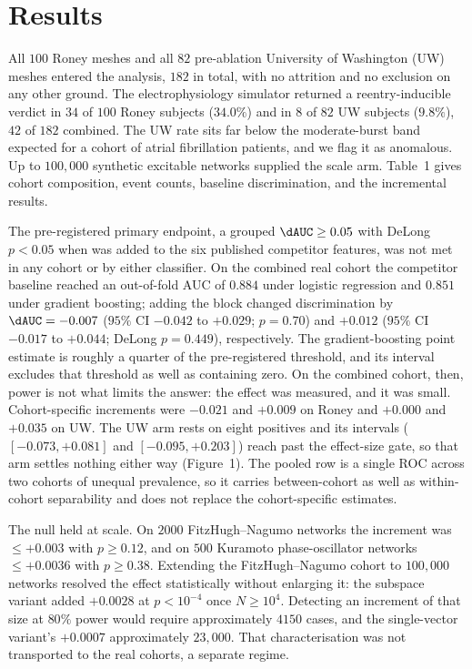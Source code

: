 ﻿\section{Results}

All $100$ Roney meshes and all $82$ pre-ablation University of Washington (UW)
meshes entered the analysis, $182$ in total, with no attrition and no exclusion
on any other ground. The
electrophysiology simulator returned a reentry-inducible verdict in $34$ of
$100$ Roney subjects ($34.0\%$) and in $8$ of $82$ UW subjects ($9.8\%$), $42$
of $182$ combined. The UW rate sits far below the moderate-burst band expected
for a cohort of atrial fibrillation patients, and we flag it as anomalous. Up to
$100{,}000$ synthetic excitable networks supplied the scale arm. Table~1 gives
cohort composition, event counts, baseline discrimination, and the incremental
results.

The pre-registered primary endpoint, a grouped $\dAUC\geq0.05$ with DeLong
$p<0.05$ when \SFI{} was added to the six published competitor features, was
not met in any cohort or by either classifier. On the combined real
cohort the competitor baseline reached an out-of-fold AUC of $0.884$ under
logistic regression and $0.851$ under gradient boosting; adding the \SFI{} block
changed discrimination by $\dAUC=-0.007$ ($95\%$ CI $-0.042$ to $+0.029$;
$p=0.70$) and $+0.012$ ($95\%$ CI $-0.017$ to $+0.044$; DeLong $p=0.449$),
respectively. The gradient-boosting point estimate is roughly a quarter of the
pre-registered threshold, and its interval excludes that threshold as well as
containing zero. On the combined cohort, then, power is not what limits the
answer: the effect was measured, and it was small. Cohort-specific increments
were $-0.021$ and $+0.009$ on Roney and $+0.000$ and $+0.035$ on UW. The UW arm
rests on eight positives and its intervals ($[-0.073,+0.081]$ and
$[-0.095,+0.203]$) reach past the effect-size gate, so that arm settles nothing
either way (Figure~1). The pooled row is a single ROC across two cohorts of
unequal prevalence, so it carries between-cohort as well as within-cohort
separability and does not replace the cohort-specific estimates.

The null held at scale. On $2000$ FitzHugh--Nagumo networks the increment was
$\leq+0.003$ with $p\geq0.12$, and on $500$ Kuramoto phase-oscillator networks
$\leq+0.0036$ with $p\geq0.38$. Extending the FitzHugh--Nagumo cohort to
$100{,}000$ networks resolved the effect statistically without enlarging it: the
subspace variant added $+0.0028$ at $p<10^{-4}$ once $N\geq10^{4}$. Detecting an
increment of that size at $80\%$ power would require approximately $4150$
cases, and the single-vector variant's $+0.0007$ approximately $23{,}000$. That
characterisation was not transported to the real cohorts, a separate regime.

